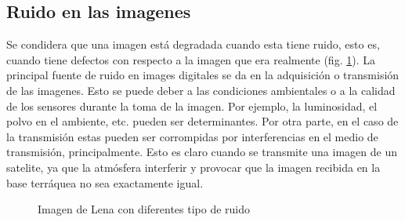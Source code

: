 \subsection{Ruido en las imagenes}
Se condidera que una imagen está degradada cuando esta tiene ruido, esto es, cuando tiene defectos con respecto a la imagen que era realmente (fig. \ref{fig:defruido}). La principal fuente de ruido en images digitales se da en la adquisición o transmisión de las imagenes. Esto se puede deber a las condiciones ambientales o a la calidad de los sensores durante la toma de la imagen. Por ejemplo, la luminosidad, el polvo en el ambiente, etc. pueden ser determinantes. Por otra parte, en el caso de la transmisión estas pueden ser corrompidas por interferencias en el medio de transmisión, principalmente. Esto es claro cuando se transmite una imagen de un satelite, ya que la atmósfera interferir y provocar que la imagen recibida en la base terráquea no sea exactamente igual.
\begin{figure}
\centering
    \quad
    \quad
    \caption{Imagen de Lena con diferentes tipo de ruido}
    \label{fig:defruido}
\end{figure}

